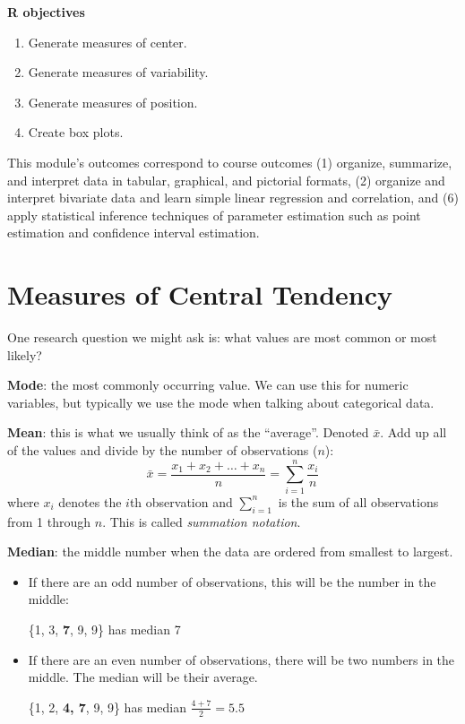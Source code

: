 \documentclass[
]{book}
\providecommand{\tightlist}{%
  \setlength{\itemsep}{0pt}\setlength{\parskip}{0pt}}
\begin{document}
\textbf{R objectives}

\begin{enumerate}
\def\labelenumi{\arabic{enumi}.}
\tightlist
\item
  Generate measures of center.
\item
  Generate measures of variability.
\item
  Generate measures of position.
\item
  Create box plots.
\end{enumerate}

This module's outcomes correspond to course outcomes (1) organize, summarize, and interpret data in tabular, graphical, and pictorial formats, (2) organize and interpret bivariate data and learn simple linear regression and correlation, and (6) apply statistical inference techniques of parameter estimation such as point estimation and confidence interval estimation.

\section{Measures of Central Tendency}\label{measures-of-central-tendency}

One research question we might ask is: what values are most common or most likely?

\textbf{Mode}: the most commonly occurring value. We can use this for numeric variables, but typically we use the mode when talking about categorical data.

\textbf{Mean}: this is what we usually think of as the ``average''. Denoted \(\bar{x}\). Add up all of the values and divide by the number of observations (\(n\)):
\[
  \bar{x} = \frac{x_1 + x_2 + \dots + x_n}{n} = \sum_{i=1}^n \frac{x_i}{n}
\]
where \(x_i\) denotes the \(i\)th observation and \(\sum_{i=1}^n\) is the sum of all observations from 1 through \(n\). This is called \emph{summation notation}.

\textbf{Median}: the middle number when the data are ordered from smallest to largest.

\begin{itemize}
\tightlist
\item
  If there are an odd number of observations, this will be the number in the middle:

  \{1, 3, \textbf{7}, 9, 9\} has median 7
\item
  If there are an even number of observations, there will be two numbers in the middle. The median will be their average.

  \{1, 2, \textbf{4, 7}, 9, 9\} has median \(\frac{4+7}{2}=5.5\)
\end{itemize}
\end{document}
